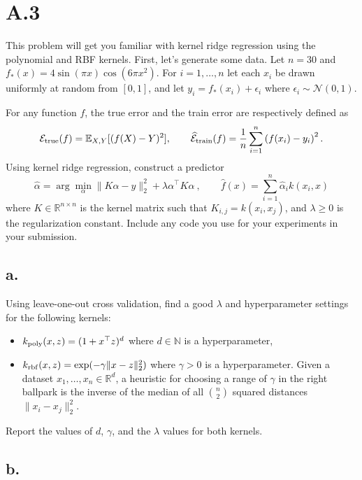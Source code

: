 \documentclass{article}
\newcommand{\field}[1]{\mathbb{#1}}
\newcommand{\1}{\mathbf{1}}
\newcommand{\E}{\mathbb{E}}
\newcommand{\R}{\field{R}} %
\newcommand{\twonorm}[1]{\|#1\|_2^2}
\begin{document}
\section*{A.3}
{\Large 

This problem will get you familiar with kernel ridge regression using the polynomial and RBF kernels.
First, let's generate some data. Let $n=30$ and $f_*(x) = 4 \sin(\pi x)\cos(6\pi x^2)$. For $i=1,\dots,n$ let each $x_i$ be drawn uniformly at random from $[0,1]$, and let $y_i = f_*(x_i) + \epsilon_i$ where $\epsilon_i \sim \mathcal{N}(0,1)$.

For any function $f$, the true error and the train error are respectively defined as
\begin{align*}
    \mathcal{E}_{\rm true}(f) = \E_{X,Y}[ ( f(X) - Y)^2], \quad \quad  \widehat{\mathcal{E}}_{\rm train}(f) =  \frac{1}{n} \sum_{i=1}^n \left(f(x_i)-y_i\right)^2.
\end{align*}
Using kernel ridge regression, construct a predictor
\[
  \widehat{\alpha} = \arg\min_\alpha \twonorm{K\alpha - y} + \lambda \alpha^\top K \alpha \ , \quad \quad \widehat{f}(x) = \sum_{i=1}^n \widehat{\alpha}_i k(x_i,x) 
\]
where $K\in\R^{n\times n}$ is the kernel matrix such that $K_{i,j} = k(x_i,x_j)$, and $\lambda\geq 0$ is the regularization constant. Include any code you use for your experiments in your submission.

\subsection*{a.}

Using leave-one-out cross validation, find a good $\lambda$ and hyperparameter settings for the following kernels:
  \begin{itemize}
    \item $k_{\rm poly}(x,z) = (1+x^\top z)^d$ where $d \in \mathbb{N}$ is a hyperparameter, 
    \item $k_{\rm rbf}(x,z) = \exp(-\gamma \twonorm{x-z})$ where $\gamma > 0$ is a hyperparameter. Given a dataset $x_1,\dots,x_n \in \R^d$, a heuristic for choosing a range of $\gamma$ in the right ballpark is the inverse of the median of all $\binom{n}{2}$ squared distances $\twonorm{x_i-x_j}$.
  \end{itemize} 
Report the values of $d$, $\gamma$, and the $\lambda$ values for both kernels.

\subsection*{b.}

}
\end{document}
